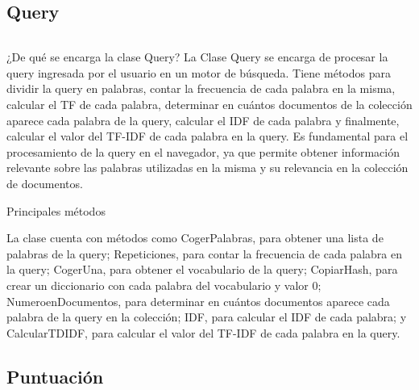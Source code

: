 \documentclass[11pt]{beamer}
\begin{document}
	\subsection {Query}
	\begin{frame}
		\begin{columns}
			\begin{column}{.4\textwidth}
				\tableofcontents[sections={1-2},currentsection, currentsubsection]
			\end{column}
			\begin{column}{.4\textwidth}
				\tableofcontents[sections={3-4},currentsection , currentsubsection]
			\end{column}
		\end{columns}
	\end{frame}
	\begin{frame}{¿De qué se encarga la clase Query?}
		\justifying
		La Clase Query se encarga de procesar la query ingresada por el usuario en un motor de búsqueda. Tiene métodos para dividir la query en palabras, contar la frecuencia de cada palabra en la misma, calcular el TF de cada palabra, determinar en cuántos documentos de la colección aparece cada palabra de la query, calcular el IDF de cada palabra y finalmente, calcular el valor del TF-IDF de cada palabra en la query. Es fundamental para el procesamiento de la query en el navegador, ya que permite obtener información relevante sobre las palabras utilizadas en la misma y su relevancia en la colección de documentos.
	\end{frame}
	
	\begin{frame}{Principales métodos}
		
		\justifying
		La clase cuenta con métodos como CogerPalabras, para obtener una lista de palabras de la query; Repeticiones, para contar la frecuencia de cada palabra en la query; CogerUna, para obtener el vocabulario de la query; CopiarHash, para crear un diccionario con cada palabra del vocabulario y valor 0; NumeroenDocumentos, para determinar en cuántos documentos aparece cada palabra de la query en la colección; IDF, para calcular el IDF de cada palabra; y CalcularTDIDF, para calcular el valor del TF-IDF de cada palabra en la query.
		
	\end{frame}
	
	\subsection {Puntuación}
	\begin{frame}
		\begin{columns}
			\begin{column}{.4\textwidth}
				\tableofcontents[sections={1-2},currentsection, currentsubsection]
			\end{column}
			\begin{column}{.4\textwidth}
				\tableofcontents[sections={3-4},currentsection , currentsubsection]
			\end{column}
		\end{columns}
	\end{frame}
	
\end{document}
